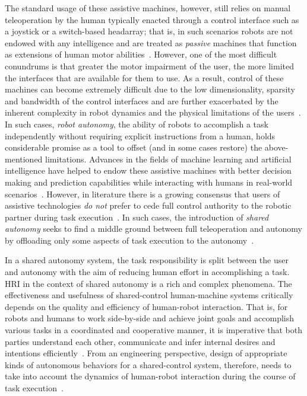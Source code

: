 \documentclass[12pt]{article}
\begin{document}
%
%
The standard usage of these assistive machines, however, still relies on manual teleoperation by the human typically enacted through a control interface such as a joystick or a switch-based headarray; that is, in such scenarios robots are not endowed with any intelligence and are treated as \textit{passive} machines that function as extensions of human motor abilities~\cite{simpson2008tooth}. However, one of the most difficult conundrums is that greater the motor impairment of the user, the more limited the interfaces that are available for them to use. As a result, control of these machines can become extremely difficult due to the low dimensionality, sparsity and bandwidth of the control interfaces and are further exacerbated by the inherent complexity in robot dynamics and the physical limitations of the users~\cite{pilarski2012dynamic}.
In such cases, \textit{robot autonomy}, the ability of robots to accomplish a task independently without requiring explicit instructions from a human, holds considerable promise as a tool to offset (and in some cases restore) the above-mentioned limitations. Advances in the fields of machine learning and artificial intelligence have helped to endow these assistive machines with better decision making and prediction capabilities while interacting with humans in real-world scenarios~\cite{huang2015using}.
However, in literature there is a growing consensus that users of assistive technologies \textit{do not} prefer to cede full control authority to the robotic partner during task execution~\cite{gopinath2017human}. In such cases, the introduction of \textit{shared autonomy} seeks to find a middle ground between full teleoperation and autonomy by offloading only some aspects of task execution to the autonomy~\cite{wasson2003user, demeester2008user}. 

In a shared autonomy system, the task responsibility is split between the user and autonomy with the aim of reducing human effort in accomplishing a task. HRI	 in the context of shared autonomy is a rich and complex phenomena. The effectiveness and usefulness of shared-control human-machine systems critically depends on the quality and efficiency of human-robot interaction. That is, for robots and humans to work side-by-side and achieve joint goals and accomplish various tasks in a coordinated and cooperative manner, it is imperative that both parties understand each other, communicate and infer internal desires and intentions efficiently~\cite{hoc2001towards}. From an engineering perspective, design of appropriate kinds of autonomous behaviors for a shared-control system, therefore, needs to take into account the dynamics of human-robot interaction during the course of task execution~\cite{hoffman2007cost}. 
\end{document}
